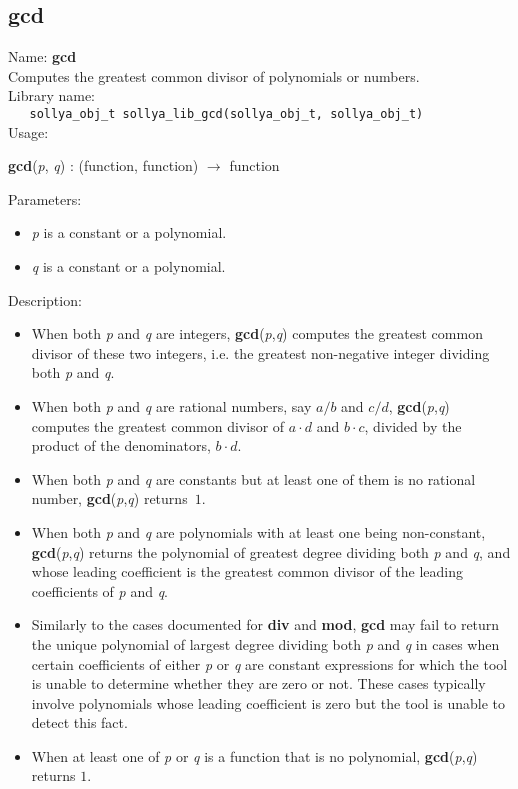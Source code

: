 \subsection{gcd}
\label{labgcd}
\noindent Name: \textbf{gcd}\\
\phantom{aaa}Computes the greatest common divisor of polynomials or numbers.\\[0.2cm]
\noindent Library name:\\
\verb|   sollya_obj_t sollya_lib_gcd(sollya_obj_t, sollya_obj_t)|\\[0.2cm]
\noindent Usage: 
\begin{center}
\textbf{gcd}(\emph{p}, \emph{q}) : (\textsf{function}, \textsf{function}) $\rightarrow$ \textsf{function}\\
\end{center}
Parameters: 
\begin{itemize}
\item \emph{p} is a constant or a polynomial.
\item \emph{q} is a constant or a polynomial.
\end{itemize}
\noindent Description: \begin{itemize}

\item When both \emph{p} and \emph{q} are integers, \textbf{gcd}(\emph{p},\emph{q}) computes the greatest
   common divisor of these two integers, i.e. the greatest non-negative integer
   dividing both \emph{p} and \emph{q}.

\item When both \emph{p} and \emph{q} are rational numbers, say $a/b$ and $c/d$,
   \textbf{gcd}(\emph{p},\emph{q}) computes the greatest common divisor of $a \cdot d$ and $b \cdot c$,
   divided by the product of the denominators, $b \cdot d$.

\item When both \emph{p} and \emph{q} are constants but at least one of them is no rational
   number, \textbf{gcd}(\emph{p},\emph{q}) returns~$1$.

\item When both \emph{p} and \emph{q} are polynomials with at least one being non-constant,
   \textbf{gcd}(\emph{p},\emph{q}) returns the polynomial of greatest degree dividing both \emph{p} and
   \emph{q}, and whose leading coefficient is the greatest common divisor of the
   leading coefficients of \emph{p} and \emph{q}.

\item Similarly to the cases documented for \textbf{div} and \textbf{mod}, \textbf{gcd}
   may fail to return the unique polynomial of largest degree dividing
   both \emph{p} and \emph{q} in cases when certain coefficients of either \emph{p} or
   \emph{q} are constant expressions for which the tool is unable to determine
   whether they are zero or not. These cases typically involve
   polynomials whose leading coefficient is zero but the tool is unable
   to detect this fact.

\item When at least one of \emph{p} or \emph{q} is a function that is no polynomial,
   \textbf{gcd}(\emph{p},\emph{q}) returns $1$.
\end{itemize}

